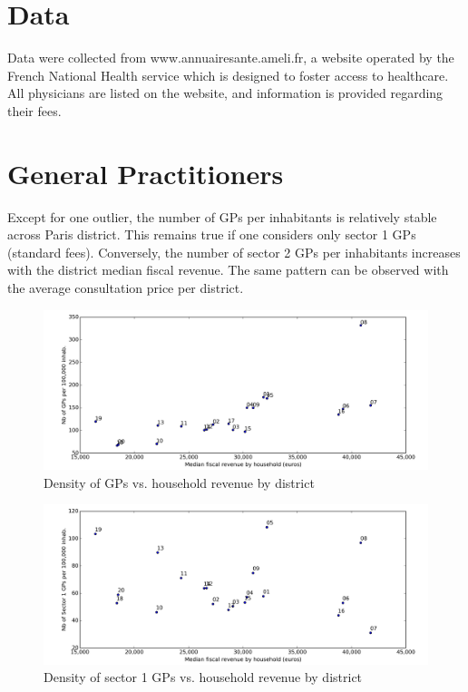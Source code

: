 \documentclass[11pt]{article}
\begin{document}
\section{Data}

Data were collected from www.annuairesante.ameli.fr, a website operated by the French National Health service which is designed to foster access to healthcare. All physicians are listed on the website, and information is provided regarding their fees.

\section{General Practitioners}

Except for one outlier, the number of GPs per inhabitants is relatively stable across Paris district. This remains true if one considers only sector 1 GPs (standard fees). Conversely, the number of sector 2 GPs per inhabitants increases with the district median fiscal revenue. The same pattern can be observed with the average consultation price per district.

\begin{figure}[H]
    \caption{Density of GPs vs. household revenue by district}
	\centering
		\includegraphics[width=16cm]{images/GP_Ardt_DensityVsRevenue.png}
\end{figure}

\begin{figure}[H]
    \caption{Density of sector 1 GPs vs. household revenue by district}
	\centering
		\includegraphics[width=16cm]{images/GP_Ardt_DensityS1VsRevenue.png}
\end{figure}
\end{document}
